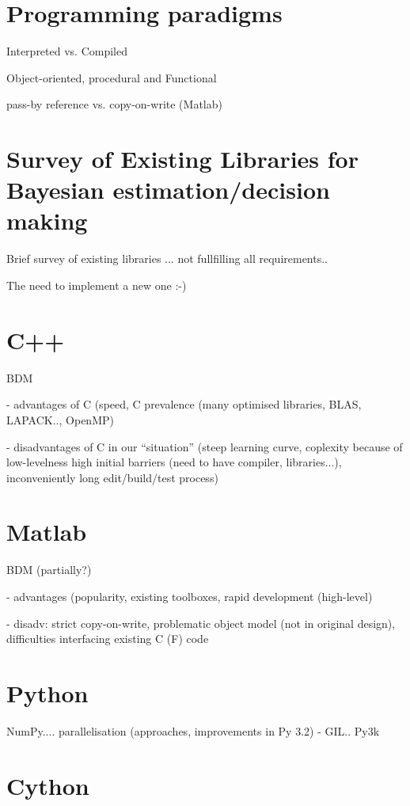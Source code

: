 \documentclass[a4paper,12pt,oneside]{report}
\begin{document}
\section{Programming paradigms}

Interpreted vs. Compiled

Object-oriented, procedural and Functional

pass-by reference vs. copy-on-write (Matlab)

\section{Survey of Existing Libraries for Bayesian estimation/decision making}

Brief survey of existing libraries ... not fullfilling all requirements..

The need to implement a new one :-)

\section{C++}

BDM

 - advantages of C (speed, C prevalence (many optimised libraries, BLAS, LAPACK.., OpenMP)

 - disadvantages of C in our ``situation'' (steep learning curve, coplexity because of low-levelness
   high initial barriers (need to have compiler, libraries...), inconveniently long edit/build/test
   process)

\section{Matlab}

BDM (partially?)

 - advantages (popularity, existing toolboxes, rapid development (high-level)

 - disadv: strict copy-on-write, problematic object model (not in original design), difficulties
           interfacing existing C (F) code

\section{Python}

NumPy.... parallelisation (approaches, improvements in Py 3.2) - GIL.. Py3k

\section{Cython}
\end{document}

